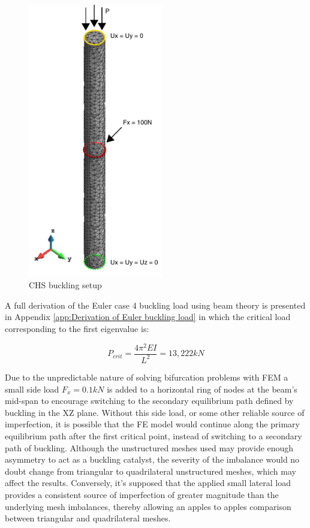 \begin{figure}[H]
	\centering
	\includegraphics[height=12cm]{images/chs_buckling_setup}
	\caption{CHS buckling setup}
	\label{fig:chsbucklingsetup}
\end{figure}

A full derivation of the Euler case 4 buckling load using beam theory is presented in Appendix \ref{app:Derivation of Euler buckling load} in which the critical load corresponding to the first eigenvalue is:

\begin{equation} 
P_{crit} = \frac{4\pi^2 EI}{L^2} = 13, 222 kN
\label{eqchs_1}
\end{equation}

Due to the unpredictable nature of solving bifurcation problems with FEM a small side load $F_x = 0.1 kN$ is added to a horizontal ring of nodes at the beam's mid-span to encourage switching to the secondary equilibrium path defined by buckling in the XZ plane. Without this side load, or some other reliable source of imperfection, it is possible that the FE model would continue along the primary equilibrium path after the first critical point, instead of switching to a secondary path of buckling. Although the unstructured meshes used may provide enough asymmetry to act as a buckling catalyst, the severity of the imbalance would no doubt change from triangular to quadrilateral unstructured meshes, which may affect the results. Conversely, it's supposed that the applied small lateral load provides a consistent source of imperfection  of greater magnitude than the underlying mesh imbalances, thereby allowing an apples to apples comparison between triangular and quadrilateral meshes.

